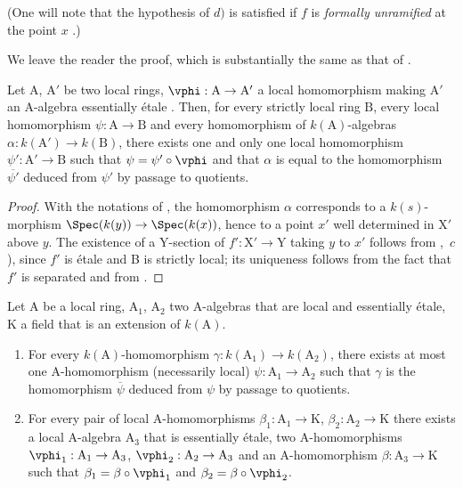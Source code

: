 
(One will note that the hypothesis of $d)$ is satisfied if $f$ is \emph{formally unramified} at the point $x$ .)

We leave the reader the proof, which is substantially the same as that of .

\begin{lemma}[18.8.4]
\label{IV.18.8.4}
Let $\mathrm{A}$, $\mathrm{A}'$ be two local rings, $\vphi:\mathrm{A}\to\mathrm{A}'$ a local homomorphism making $\mathrm{A}'$ an A-algebra essentially \'{e}tale .
Then, for every strictly local ring $\mathrm{B}$, every local homomorphism $\psi:\mathrm{A}\to\mathrm{B}$ and every homomorphism of $k(\mathrm{A})$-algebras $\alpha:k(\mathrm{A}')\to k(\mathrm{B})$, there exists one and only one local homomorphism $\psi':\mathrm{A}'\to\mathrm{B}$ such that $\psi=\psi'\circ\vphi$ and that $\alpha$ is equal to the homomorphism $\overline{\psi'}$ deduced from $\psi'$ by passage to quotients.
\end{lemma}

\begin{proof}
With the notations of , the homomorphism $\alpha$ corresponds to a $k(s)$-morphism $\Spec(k(y))\to\Spec(k(x))$, hence to a point $x'$ well determined in $\mathrm{X}'$ above $y$.
The existence of a Y-section of $f':\mathrm{X}'\to\mathrm{Y}$ taking $y$ to $x'$ follows from ,~$c$), since $f'$ is \'{e}tale and B is strictly local; its uniqueness follows from the fact that $f'$ is separated and from .
\end{proof}

\begin{lemma}[18.8.5]
\label{IV.18.8.5}
Let $\mathrm{A}$ be a local ring, $\mathrm{A}_1$, $\mathrm{A}_2$ two A-algebras that are local and essentially \'{e}tale, K a field that is an extension of $k(\mathrm{A})$.
\begin{enumerate}[label=\emph{\roman*)}]
  \item For every $k(\mathrm{A})$-homomorphism $\gamma:k(\mathrm{A}_1)\to k(\mathrm{A}_2)$, there exists at most one A-homomorphism (necessarily local) $\psi:\mathrm{A}_1\to\mathrm{A}_2$ such that $\gamma$ is the homomorphism $\overline{\psi}$ deduced from $\psi$ by passage to quotients.
  \item For every pair of local A-homomorphisms $\beta_1:\mathrm{A}_1\to\mathrm{K}$, $\beta_2:\mathrm{A}_2\to\mathrm{K}$ there exists a local A-algebra $\mathrm{A}_3$ that is essentially \'{e}tale, two A-homomorphisms $\vphi_1:\mathrm{A}_1\to\mathrm{A}_3$, $\vphi_2:\mathrm{A}_2\to\mathrm{A}_3$ and an A-homomorphism $\beta:\mathrm{A}_3\to\mathrm{K}$ such that $\beta_1=\beta\circ\vphi_1$ and $\beta_2=\beta\circ\vphi_2$.
\end{enumerate}
\end{lemma}

